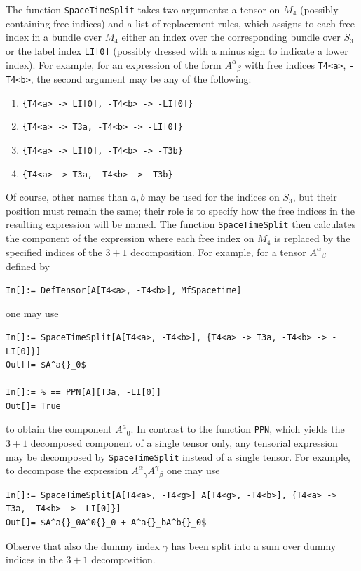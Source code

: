 \documentclass[notitlepage,a4paper,aps,prd,onecolumn,superscriptaddress,nofootinbib,groupedaddress,longbibliography]{revtex4-1}
\begin{document}
The function \lstinline/SpaceTimeSplit/ takes two arguments: a tensor on \(M_4\) (possibly containing free indices) and a list of replacement rules, which assigns to each free index in a bundle over \(M_4\) either an index over the corresponding bundle over \(S_3\) or the label index \lstinline/LI[0]/ (possibly dressed with a minus sign to indicate a lower index). For example, for an expression of the form \(A^{\alpha}{}_{\beta}\) with free indices \lstinline/T4<a>/, \lstinline/-T4<b>/, the second argument may be any of the following:
\begin{enumerate}
\item \lstinline/{T4<a> -> LI[0], -T4<b> -> -LI[0]}/
\item \lstinline/{T4<a> -> T3a, -T4<b> -> -LI[0]}/
\item \lstinline/{T4<a> -> LI[0], -T4<b> -> -T3b}/
\item \lstinline/{T4<a> -> T3a, -T4<b> -> -T3b}/
\end{enumerate}
Of course, other names than \(a, b\) may be used for the indices on \(S_3\), but their position must remain the same; their role is to specify how the free indices in the resulting expression will be named. The function \lstinline/SpaceTimeSplit/ then calculates the component of the expression where each free index on \(M_4\) is replaced by the specified indices of the $3+1$ decomposition. For example, for a tensor \(A^{\alpha}{}_{\beta}\) defined by
\begin{lstlisting}
In[]:= DefTensor[A[T4<a>, -T4<b>], MfSpacetime]
\end{lstlisting}
one may use
\begin{lstlisting}
In[]:= SpaceTimeSplit[A[T4<a>, -T4<b>], {T4<a> -> T3a, -T4<b> -> -LI[0]}]
Out[]= $A^a{}_0$

In[]:= % == PPN[A][T3a, -LI[0]]
Out[]= True
\end{lstlisting}
to obtain the component $A^a{}_0$. In contrast to the function \lstinline/PPN/, which yields the $3+1$ decomposed component of a single tensor only, any tensorial expression may be decomposed by \lstinline/SpaceTimeSplit/ instead of a single tensor. For example, to decompose the expression \(A^{\alpha}{}_{\gamma}A^{\gamma}{}_{\beta}\) one may use
\begin{lstlisting}
In[]:= SpaceTimeSplit[A[T4<a>, -T4<g>] A[T4<g>, -T4<b>], {T4<a> -> T3a, -T4<b> -> -LI[0]}]
Out[]= $A^a{}_0A^0{}_0 + A^a{}_bA^b{}_0$
\end{lstlisting}
Observe that also the dummy index \(\gamma\) has been split into a sum over dummy indices in the $3+1$ decomposition.
\end{document}

